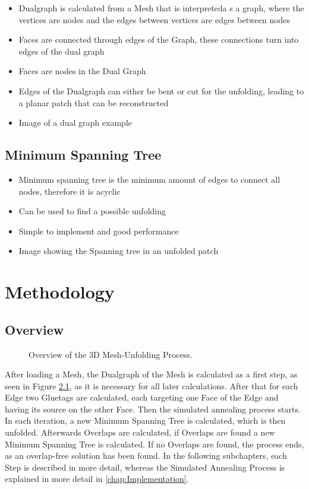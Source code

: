 \documentclass[draft,final]{vutinfth} %
\begin{document}
\begin{itemize}
	\item Dualgraph is calculated from a Mesh that is interpreteda s a graph, where the vertices are nodes and the edges between vertices are edges between nodes
	\item Faces are connected through edges of the Graph, these connections turn into edges of the dual graph
	\item Faces are nodes in the Dual Graph
	\item Edges of the Dualgraph can either be bent or cut for the unfolding, leading to a planar patch that can be reconstructed
	\item Image of a dual graph example
\end{itemize}

\section{Minimum Spanning Tree}

\begin{itemize}
	\item Minimum spanning tree is the minimum amount of edges to connect all nodes, therefore it is acyclic
	\item Can be used to find a possible unfolding
	\item Simple to implement and good performance
	\item Image showing the Spanning tree in an unfolded patch
\end{itemize}

\chapter{Methodology}

\section{Overview}

\begin{figure}

\caption{Overview of the 3D Mesh-Unfolding Process.}
\label{fig:overview}
\end{figure}

After loading a Mesh, the Dualgraph of the Mesh is calculated as a first step, as seen in Figure \ref{fig:overview}, as it is necessary for all later calculations. After that for each Edge two Gluetags are calculated, each targeting one Face of the Edge and having its source on the other Face. Then the simulated annealing process starts. In each iteration, a new Minimum Spanning Tree is calculated, which is then unfolded. Afterwards Overlaps are calculated, if Overlaps are found a new Minimum Spanning Tree is calculated. If no Overlaps are found, the process ends, as an overlap-free solution has been found. In the following subchapters, each Step is described in more detail, whereas the Simulated Annealing Process is explained in more detail in \autoref{chap:Implementation}.
\end{document}
